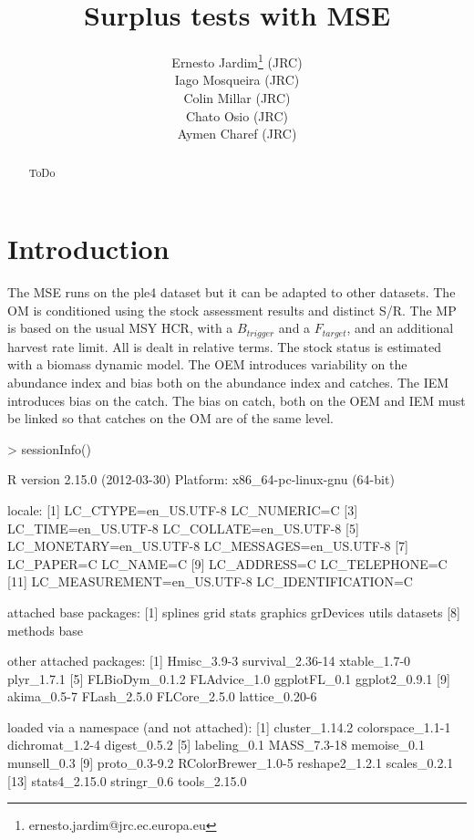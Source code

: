 \documentclass[a4paper]{article}
\begin{document}
\title{Surplus tests with MSE}
\author{Ernesto Jardim\footnote{ernesto.jardim@jrc.ec.europa.eu} (JRC)\\ Iago Mosqueira (JRC) \\ Colin Millar (JRC)\\ Chato Osio (JRC)\\ Aymen Charef (JRC)}
\maketitle
\begin{abstract}
ToDo
\end{abstract} 

\pagebreak
\section{Introduction}

The MSE runs on the ple4 dataset but it can be adapted to other datasets. The OM is conditioned using the stock assessment results and distinct S/R. The MP is based on the usual MSY HCR, with a $B_{trigger}$ and a $F_{target}$, and an additional harvest rate limit. All is dealt in relative terms. The stock status is estimated with a biomass dynamic model. The OEM introduces variability on the abundance index and bias both on the abundance index and catches. The IEM introduces bias on the catch. The bias on catch, both on the OEM and IEM must be linked so that catches on the OM are of the same level.


\begin{Schunk}
\begin{Sinput}
> sessionInfo()
\end{Sinput}
\begin{Soutput}
R version 2.15.0 (2012-03-30)
Platform: x86_64-pc-linux-gnu (64-bit)

locale:
 [1] LC_CTYPE=en_US.UTF-8       LC_NUMERIC=C              
 [3] LC_TIME=en_US.UTF-8        LC_COLLATE=en_US.UTF-8    
 [5] LC_MONETARY=en_US.UTF-8    LC_MESSAGES=en_US.UTF-8   
 [7] LC_PAPER=C                 LC_NAME=C                 
 [9] LC_ADDRESS=C               LC_TELEPHONE=C            
[11] LC_MEASUREMENT=en_US.UTF-8 LC_IDENTIFICATION=C       

attached base packages:
[1] splines   grid      stats     graphics  grDevices utils     datasets 
[8] methods   base     

other attached packages:
 [1] Hmisc_3.9-3      survival_2.36-14 xtable_1.7-0     plyr_1.7.1      
 [5] FLBioDym_0.1.2   FLAdvice_1.0     ggplotFL_0.1     ggplot2_0.9.1   
 [9] akima_0.5-7      FLash_2.5.0      FLCore_2.5.0     lattice_0.20-6  

loaded via a namespace (and not attached):
 [1] cluster_1.14.2     colorspace_1.1-1   dichromat_1.2-4    digest_0.5.2      
 [5] labeling_0.1       MASS_7.3-18        memoise_0.1        munsell_0.3       
 [9] proto_0.3-9.2      RColorBrewer_1.0-5 reshape2_1.2.1     scales_0.2.1      
[13] stats4_2.15.0      stringr_0.6        tools_2.15.0      
\end{Soutput}
\end{Schunk}
\end{document}
